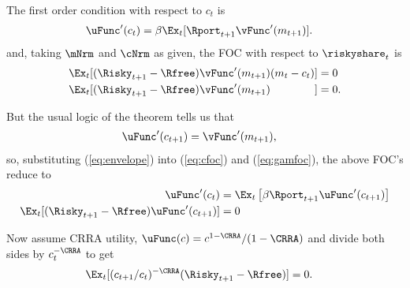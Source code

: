 \documentclass{\econtex}
\begin{document}
The first order condition with respect to $c_{t}$ is
\begin{equation}\begin{gathered}\begin{aligned}
      \uFunc^{\prime}(c_{t}) & =  \beta \Ex_{t}[ \Rport_{t+1}\vFunc^{\prime}({m}_{t+1})] \label{eq:cfoc}.
    \end{aligned}\end{gathered}\end{equation}
and, taking $\mNrm$ and $\cNrm$ as given, the FOC with respect to $\riskyshare_{t}$ is
\begin{equation}\begin{gathered}\begin{aligned}
      \Ex_{t}[(\Risky_{t+1}-\Rfree)\vFunc^{\prime}({m}_{t+1})({m}_{t}-{c}_{t})] & =  0 
      \\      \Ex_{t}[(\Risky_{t+1}-\Rfree)\vFunc^{\prime}({m}_{t+1})\phantom{({m}_{t}-{c}_{t})}] & =  0 \label{eq:gamfoc}
      .
    \end{aligned}\end{gathered}\end{equation}

But the usual logic of the  theorem tells us that 
\begin{equation}\begin{gathered}\begin{aligned}
      \uFunc^{\prime}(c_{t+1}) & =  \vFunc^{\prime}(m_{t+1}), \label{eq:envelope}
    \end{aligned}\end{gathered}\end{equation}
so, substituting (\ref{eq:envelope}) into (\ref{eq:cfoc}) and (\ref{eq:gamfoc}), the above FOC's reduce to
\begin{equation}\begin{gathered}\begin{aligned}
      \uFunc^{\prime}(c_{t}) & =  \Ex_{t}\left[\beta  \Rport_{t+1} \uFunc^{\prime}({c}_{t+1})\right] \label{eq:ceuler}
      \\      \Ex_{t}[(\Risky_{t+1}-\Rfree)\uFunc^{\prime}({c}_{t+1})] & =  0 %
    \end{aligned}\end{gathered}\end{equation}

Now assume CRRA utility, $\uFunc(c) = c^{1-\CRRA}/(1-\CRRA)$ and divide both 
sides by $c_{t}^{-\CRRA}$ to get
\begin{equation}\begin{gathered}\begin{aligned}
      \Ex_{t}[(c_{t+1}/c_{t})^{-\CRRA}(\Risky_{t+1}-\Rfree)] & =  0. \label{eq:gameulernew}
    \end{aligned}\end{gathered}\end{equation}
\end{document}
